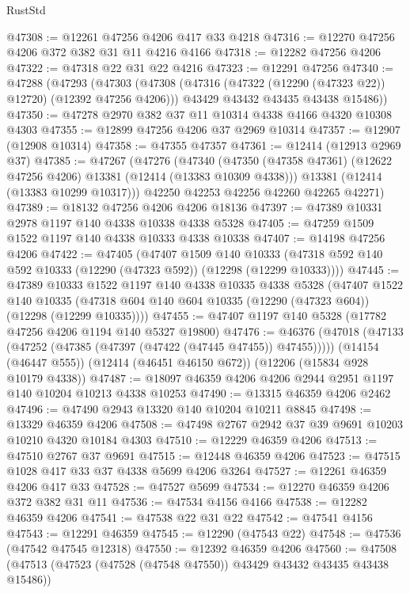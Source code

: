 \begin{lexlean}{RustStd}
\begin{coremodule}
{\begin{coremodule}
{{{{{{{{{{{{{{{{{{{{{{{{{{{{{{{{{{{{{{{{{{{{{{{{{{@47308 := @12261 @47256 @4206 @417 @33 @4218
@47316 := @12270 @47256 @4206 @372 @382 @31 @11 @4216 @4166
@47318 := @12282 @47256 @4206
@47322 := @47318 @22 @31 @22 @4216
@47323 := @12291 @47256
@47340 := @47288
    (@47293
      (@47303
        (@47308 (@47316 (@47322 (@12290 (@47323 @22)) @12720) (@12392 @47256 @4206)))
        @43429
        @43432
        @43435
        @43438
        @15486))
@47350 := @47278 @2970 @382 @37 @11 @10314 @4338 @4166 @4320 @10308 @4303
@47355 := @12899 @47256 @4206 @37 @2969 @10314
@47357 := @12907 (@12908 @10314)
@47358 := @47355 @47357
@47361 := @12414 (@12913 @2969 @37)
@47385 := @47267
    (@47276
      (@47340
        (@47350 (@47358 @47361) (@12622 @47256 @4206) @13381 (@12414 (@13383 @10309 @4338)))
        @13381
        (@12414 (@13383 @10299 @10317)))
      @42250
      @42253
      @42256
      @42260
      @42265
      @42271)
@47389 := @18132 @47256 @4206 @4206 @18136
@47397 := @47389 @10331 @2978 @1197 @140 @4338 @10338 @4338 @5328
@47405 := @47259 @1509 @1522 @1197 @140 @4338 @10333 @4338 @10338
@47407 := @14198 @47256 @4206
@47422 := @47405
    (@47407
      @1509
      @140
      @10333
      (@47318 @592 @140 @592 @10333 (@12290 (@47323 @592)) (@12298 (@12299 @10333))))
@47445 := @47389
    @10333
    @1522
    @1197
    @140
    @4338
    @10335
    @4338
    @5328
    (@47407
      @1522
      @140
      @10335
      (@47318 @604 @140 @604 @10335 (@12290 (@47323 @604)) (@12298 (@12299 @10335))))
@47455 := @47407 @1197 @140 @5328 (@17782 @47256 @4206 @1194 @140 @5327 @19800)
@47476 := @46376
    (@47018 (@47133 (@47252 (@47385 (@47397 (@47422 (@47445 @47455)) @47455)))))
    (@14154 (@46447 @555))
    (@12414 (@46451 @46150 @672))
    (@12206 (@15834 @928 @10179 @4338))
@47487 := @18097 @46359 @4206 @4206 @2944 @2951 @1197 @140 @10204 @10213 @4338 @10253
@47490 := @13315 @46359 @4206 @2462
@47496 := @47490 @2943 @13320 @140 @10204 @10211 @8845
@47498 := @13329 @46359 @4206
@47508 := @47498 @2767 @2942 @37 @39 @9691 @10203 @10210 @4320 @10184 @4303
@47510 := @12229 @46359 @4206
@47513 := @47510 @2767 @37 @9691
@47515 := @12448 @46359 @4206
@47523 := @47515 @1028 @417 @33 @37 @4338 @5699 @4206 @3264
@47527 := @12261 @46359 @4206 @417 @33
@47528 := @47527 @5699
@47534 := @12270 @46359 @4206 @372 @382 @31 @11
@47536 := @47534 @4156 @4166
@47538 := @12282 @46359 @4206
@47541 := @47538 @22 @31 @22
@47542 := @47541 @4156
@47543 := @12291 @46359
@47545 := @12290 (@47543 @22)
@47548 := @47536 (@47542 @47545 @12318)
@47550 := @12392 @46359 @4206
@47560 := @47508 (@47513 (@47523 (@47528 (@47548 @47550)) @43429 @43432 @43435 @43438 @15486))
}}}}}}}}}}}}}}}}}}}}}}}}}}}}}}}}}}}}}}}}}}}}}}}}}}
\end{coremodule}}
\end{coremodule}
\end{lexlean}
